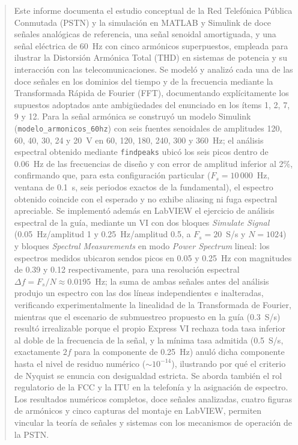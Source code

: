 \documentclass[conference]{IEEEtran}
\begin{document}
\begin{abstract}
Este informe documenta el estudio conceptual de la Red Telefónica Pública Conmutada (PSTN) y la simulación en MATLAB y Simulink de doce señales analógicas de referencia, una señal senoidal amortiguada, y una señal eléctrica de 60~Hz con cinco armónicos superpuestos, empleada para ilustrar la Distorsión Armónica Total (THD) en sistemas de potencia y su interacción con las telecomunicaciones. Se modeló y analizó cada una de las doce señales en los dominios del tiempo y de la frecuencia mediante la Transformada Rápida de Fourier (FFT), documentando explícitamente los supuestos adoptados ante ambigüedades del enunciado en los ítems 1, 2, 7, 9 y 12. Para la señal armónica se construyó un modelo Simulink (\texttt{modelo\_armonicos\_60hz}) con seis fuentes senoidales de amplitudes 120, 60, 40, 30, 24 y 20~V en 60, 120, 180, 240, 300 y 360~Hz; el análisis espectral obtenido mediante \texttt{findpeaks} ubicó los seis picos dentro de 0.06~Hz de las frecuencias de diseño y con error de amplitud inferior al 2\%, confirmando que, para esta configuración particular ($F_s=10\,000$~Hz, ventana de 0.1~s, seis periodos exactos de la fundamental), el espectro obtenido coincide con el esperado y no exhibe aliasing ni fuga espectral apreciable. Se implementó además en LabVIEW el ejercicio de análisis espectral de la guía, mediante un VI con dos bloques \textit{Simulate Signal} (0.05~Hz/amplitud 1 y 0.25~Hz/amplitud 0.5, a $F_s=20$~S/s y $N=1024$) y bloques \textit{Spectral Measurements} en modo \textit{Power Spectrum} lineal: los espectros medidos ubicaron sendos picos en 0.05 y 0.25~Hz con magnitudes de 0.39 y 0.12 respectivamente, para una resolución espectral $\Delta f = F_s/N \approx 0.0195$~Hz; la suma de ambas señales antes del análisis produjo un espectro con las dos líneas independientes e inalteradas, verificando experimentalmente la linealidad de la Transformada de Fourier, mientras que el escenario de submuestreo propuesto en la guía (0.3~S/s) resultó irrealizable porque el propio Express VI rechaza toda tasa inferior al doble de la frecuencia de la señal, y la mínima tasa admitida (0.5~S/s, exactamente $2f$ para la componente de 0.25~Hz) anuló dicha componente hasta el nivel de residuo numérico ($\sim10^{-14}$), ilustrando por qué el criterio de Nyquist se enuncia con desigualdad estricta. Se aborda también el rol regulatorio de la FCC y la ITU en la telefonía y la asignación de espectro. Los resultados numéricos completos, doce señales analizadas, cuatro figuras de armónicos y cinco capturas del montaje en LabVIEW, permiten vincular la teoría de señales y sistemas con los mecanismos de operación de la PSTN.
\end{abstract}
\end{document}
